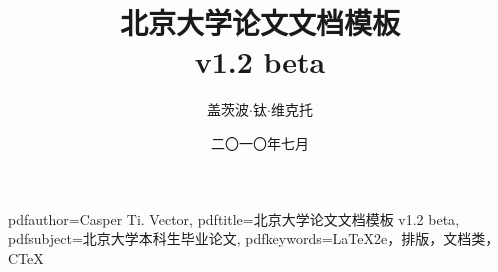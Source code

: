 \documentclass[UTF8,hyperref]{pkuthss}
\begin{document}
	\hypersetup
	{
		pdfauthor={Casper Ti. Vector},
		pdftitle={北京大学论文文档模板 v1.2 beta},
		pdfsubject={北京大学本科生毕业论文},
		pdfkeywords={LaTeX2e，排版，文档类，CTeX}
	}

	\renewcommand{\thesisname}{本科生毕业论文}
	\title{北京大学论文文档模板\\v1.2 beta}
	\author{盖茨波$\cdot$钛$\cdot$维克托}
	\date{二〇一〇年七月}

	\frontmatter{}

	\maketitle
	
	

	\cleardoublepage
	\tableofcontents

	\mainmatter{}

	
	
	
	
	
	
	
	\begin{appendix}
		

		
	\end{appendix}

	\backmatter{}

	
	\cleardoublepage\pagestyle{empty}
	
\end{document}
